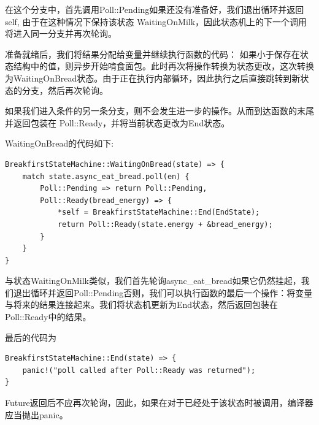 在这个分支中，首先调用Poll::Pending如果还没有准备好，我们退出循环并返回self, 由于在这种情况下保持该状态 WaitingOnMilk，因此状态机上的下一个调用将进入同一分支并再次轮询。

准备就绪后，我们将结果分配给变量并继续执行函数的代码： 如果小于保存在状态结构中的值，则异步开始啃食面包。此时再次将操作转换为状态更改，这次转换为WaitingOnBread状态。由于正在执行内部循环，因此执行之后直接跳转到新状态的分支，然后再次轮询。

如果我们进入条件的另一条分支，则不会发生进一步的操作。从而到达函数的末尾并返回包装在 Poll::Ready，并将当前状态更改为End状态。


WaitingOnBread的代码如下:

\begin{lstlisting}[caption=WaitingOnBread Branch]
BreakfirstStateMachine::WaitingOnBread(state) => {
    match state.async_eat_bread.poll(en) {
        Poll::Pending => return Poll::Pending,
        Poll::Ready(bread_energy) => {
            *self = BreakfirstStateMachine::End(EndState);
            return Poll::Ready(state.energy + &bread_energy);
        }
    }
} 
\end{lstlisting}
与状态WaitingOnMilk类似，我们首先轮询async\_eat\_bread如果它仍然挂起，我们退出循环并返回Poll::Pending否则，我们可以执行函数的最后一个操作：将变量与将来的结果连接起来。我们将状态机更新为End状态，然后返回包装在Poll::Ready中的结果。

最后的代码为

\begin{lstlisting}[caption=End Branch]
BreakfirstStateMachine::End(state) => {
    panic!("poll called after Poll::Ready was returned");
} 
\end{lstlisting}
Future返回后不应再次轮询，因此，如果在对于已经处于该状态时被调用，编译器应当抛出panic。